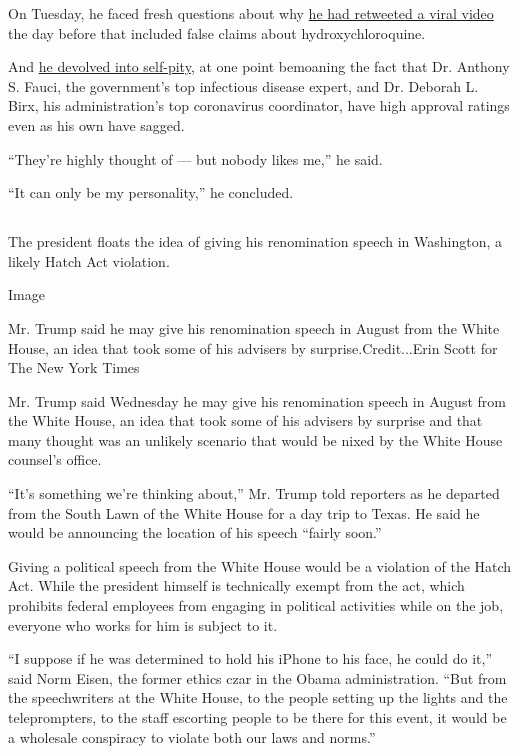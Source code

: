 On Tuesday, he faced fresh questions about why
\href{https://www.nytimes.com/2020/07/28/technology/virus-video-trump.html}{he
had retweeted a viral video} the day before that included false claims
about hydroxychloroquine.

And
\href{https://www.nytimes.com/2020/07/28/us/politics/trump-nobody-likes-me-walks-out-briefing.html}{he
devolved into self-pity}, at one point bemoaning the fact that Dr.
Anthony S. Fauci, the government's top infectious disease expert, and
Dr. Deborah L. Birx, his administration's top coronavirus coordinator,
have high approval ratings even as his own have sagged.

``They're highly thought of --- but nobody likes me,'' he said.

``It can only be my personality,'' he concluded.

\hypertarget{-3}{%
\subsection{}\label{-3}}

The president floats the idea of giving his renomination speech in
Washington, a likely Hatch Act violation.

Image

Mr. Trump said he may give his renomination speech in August from the
White House, an idea that took some of his advisers by
surprise.Credit...Erin Scott for The New York Times

Mr. Trump said Wednesday he may give his renomination speech in August
from the White House, an idea that took some of his advisers by surprise
and that many thought was an unlikely scenario that would be nixed by
the White House counsel's office.

``It's something we're thinking about,'' Mr. Trump told reporters as he
departed from the South Lawn of the White House for a day trip to Texas.
He said he would be announcing the location of his speech ``fairly
soon.''

Giving a political speech from the White House would be a violation of
the Hatch Act. While the president himself is technically exempt from
the act, which prohibits federal employees from engaging in political
activities while on the job, everyone who works for him is subject to
it.

``I suppose if he was determined to hold his iPhone to his face, he
could do it,'' said Norm Eisen, the former ethics czar in the Obama
administration. ``But from the speechwriters at the White House, to the
people setting up the lights and the teleprompters, to the staff
escorting people to be there for this event, it would be a wholesale
conspiracy to violate both our laws and norms.''

